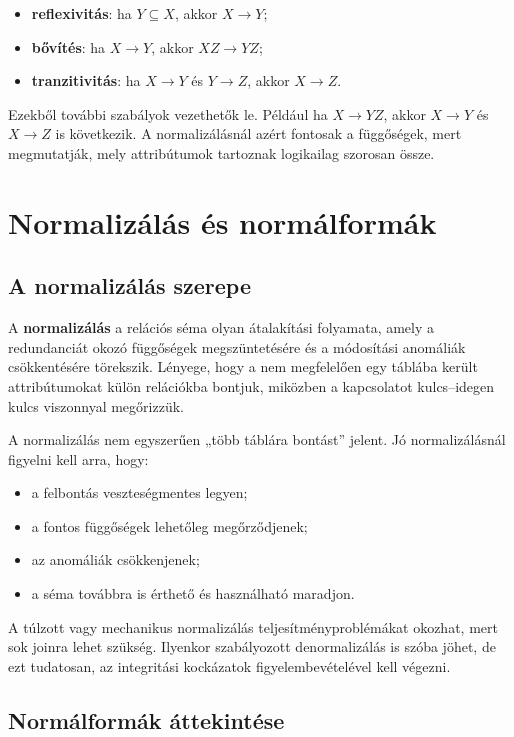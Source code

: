 \begin{itemize}
  \item \textbf{reflexivitás}: ha \(Y \subseteq X\), akkor \(X \to Y\);
  \item \textbf{bővítés}: ha \(X \to Y\), akkor \(XZ \to YZ\);
  \item \textbf{tranzitivitás}: ha \(X \to Y\) és \(Y \to Z\), akkor \(X \to Z\).
\end{itemize}

Ezekből további szabályok vezethetők le. Például ha \(X \to YZ\), akkor \(X \to Y\) és \(X \to Z\) is következik. A normalizálásnál azért fontosak a függőségek, mert megmutatják, mely attribútumok tartoznak logikailag szorosan össze.

\section{Normalizálás és normálformák}

\subsection{A normalizálás szerepe}

A \textbf{normalizálás} a relációs séma olyan átalakítási folyamata, amely a redundanciát okozó függőségek megszüntetésére és a módosítási anomáliák csökkentésére törekszik. Lényege, hogy a nem megfelelően egy táblába került attribútumokat külön relációkba bontjuk, miközben a kapcsolatot kulcs--idegen kulcs viszonnyal megőrizzük.

A normalizálás nem egyszerűen „több táblára bontást” jelent. Jó normalizálásnál figyelni kell arra, hogy:

\begin{itemize}
  \item a felbontás veszteségmentes legyen;
  \item a fontos függőségek lehetőleg megőrződjenek;
  \item az anomáliák csökkenjenek;
  \item a séma továbbra is érthető és használható maradjon.
\end{itemize}

A túlzott vagy mechanikus normalizálás teljesítményproblémákat okozhat, mert sok joinra lehet szükség. Ilyenkor szabályozott denormalizálás is szóba jöhet, de ezt tudatosan, az integritási kockázatok figyelembevételével kell végezni.

\subsection{Normálformák áttekintése}


